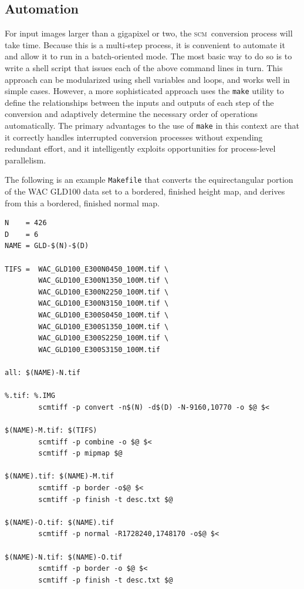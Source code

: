 \documentclass[oneside,10pt]{memoir}
\newcommand{\scm}     {\textsc{scm}}
\begin{document}
\begin{Spacing}{1.1}
\section{Automation}
\label{sec:automation}

For input images larger than a gigapixel or two, the \scm\ conversion process will take time. Because this is a multi-step process, it is convenient to automate it and allow it to run in a batch-oriented mode. The most basic way to do so is to write a shell script that issues each of the above command lines in turn. This approach can be modularized using shell variables and loops, and works well in simple cases. However, a more sophisticated approach uses the \texttt{make} utility to define the relationships between the inputs and outputs of each step of the conversion and adaptively determine the necessary order of operations automatically. The primary advantages to the use of \texttt{make} in this context are that it correctly handles interrupted conversion processes without expending redundant effort, and it intelligently exploits opportunities for process-level parallelism.

The following is an example \texttt{Makefile} that converts the equirectangular portion of the WAC GLD100 data set to a bordered, finished height map, and derives from this a bordered, finished normal map.

\begin{Verbatim}
N    = 426
D    = 6
NAME = GLD-$(N)-$(D)

TIFS =  WAC_GLD100_E300N0450_100M.tif \
        WAC_GLD100_E300N1350_100M.tif \
        WAC_GLD100_E300N2250_100M.tif \
        WAC_GLD100_E300N3150_100M.tif \
        WAC_GLD100_E300S0450_100M.tif \
        WAC_GLD100_E300S1350_100M.tif \
        WAC_GLD100_E300S2250_100M.tif \
        WAC_GLD100_E300S3150_100M.tif

all: $(NAME)-N.tif

%.tif: %.IMG
        scmtiff -p convert -n$(N) -d$(D) -N-9160,10770 -o $@ $<

$(NAME)-M.tif: $(TIFS)
        scmtiff -p combine -o $@ $<
        scmtiff -p mipmap $@

$(NAME).tif: $(NAME)-M.tif
        scmtiff -p border -o$@ $<
        scmtiff -p finish -t desc.txt $@

$(NAME)-O.tif: $(NAME).tif
        scmtiff -p normal -R1728240,1748170 -o$@ $<

$(NAME)-N.tif: $(NAME)-O.tif
        scmtiff -p border -o $@ $<
        scmtiff -p finish -t desc.txt $@
\end{Verbatim}


\end{Spacing}
\end{document}

